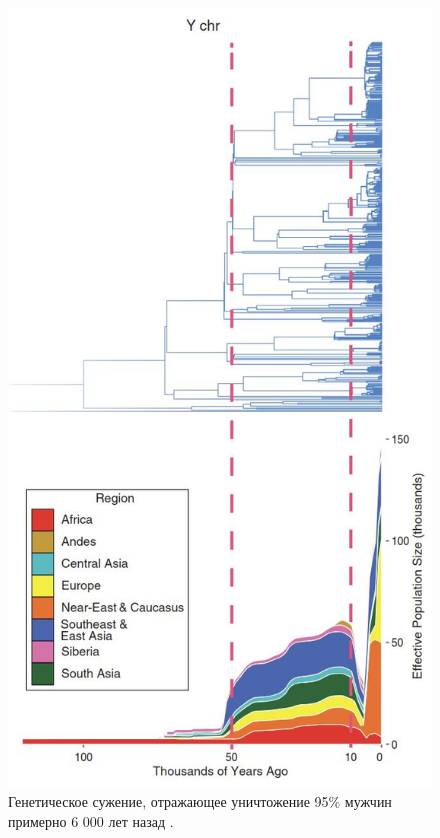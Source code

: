 \documentclass[10pt,twocolumn,letterpaper]{article}
\begin{document}
\begin{figure}[b]
\begin{center}
   \includegraphics[width=1\linewidth]{bottleneck.jpg}
\end{center}
   \caption{Генетическое сужение, отражающее уничтожение 95\% мужчин примерно 6 000 лет назад \cite{62}.}
\label{fig:10}
\label{fig:onecol}
\end{figure}
\end{document}

